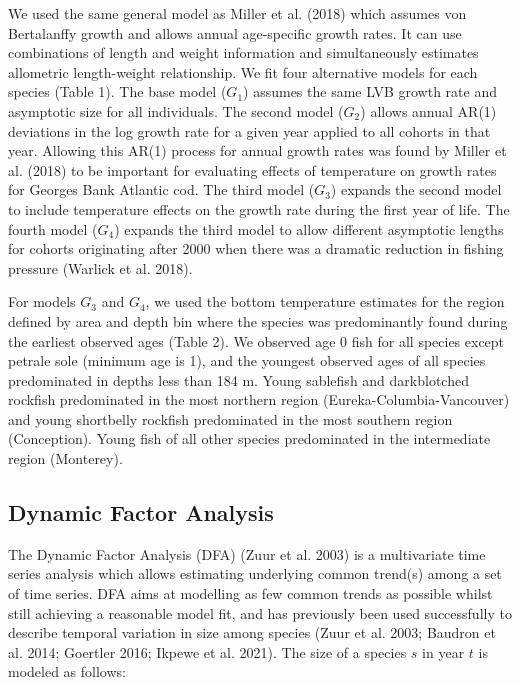 \documentclass[
]{article}
\begin{document}
We used the same general model as Miller et al. (2018) which assumes von
Bertalanffy growth and allows annual age-specific growth rates. It can
use combinations of length and weight information and simultaneously
estimates allometric length-weight relationship. We fit four alternative
models for each species (Table 1). The base model (\(G_1\)) assumes the
same LVB growth rate and asymptotic size for all individuals. The second
model (\(G_2\)) allows annual AR(1) deviations in the log growth rate
for a given year applied to all cohorts in that year. Allowing this
AR(1) process for annual growth rates was found by Miller et al. (2018)
to be important for evaluating effects of temperature on growth rates
for Georges Bank Atlantic cod. The third model (\(G_3\)) expands the
second model to include temperature effects on the growth rate during
the first year of life. The fourth model (\(G_4\)) expands the third
model to allow different asymptotic lengths for cohorts originating
after 2000 when there was a dramatic reduction in fishing pressure
(Warlick et al. 2018).

For models \(G_3\) and \(G_4\), we used the bottom temperature estimates
for the region defined by area and depth bin where the species was
predominantly found during the earliest observed ages (Table 2). We
observed age 0 fish for all species except petrale sole (minimum age is
1), and the youngest observed ages of all species predominated in depths
less than 184 m. Young sablefish and darkblotched rockfish predominated
in the most northern region (Eureka-Columbia-Vancouver) and young
shortbelly rockfish predominated in the most southern region
(Conception). Young fish of all other species predominated in the
intermediate region (Monterey).

\hypertarget{dynamic-factor-analysis}{%
\subsection{Dynamic Factor Analysis}\label{dynamic-factor-analysis}}

The Dynamic Factor Analysis (DFA) (Zuur et al. 2003) is a multivariate
time series analysis which allows estimating underlying common trend(s)
among a set of time series. DFA aims at modelling as few common trends
as possible whilst still achieving a reasonable model fit, and has
previously been used successfully to describe temporal variation in size
among species (Zuur et al. 2003; Baudron et al. 2014; Goertler 2016;
Ikpewe et al. 2021). The size of a species \(s\) in year \(t\) is
modeled as follows:
\end{document}
